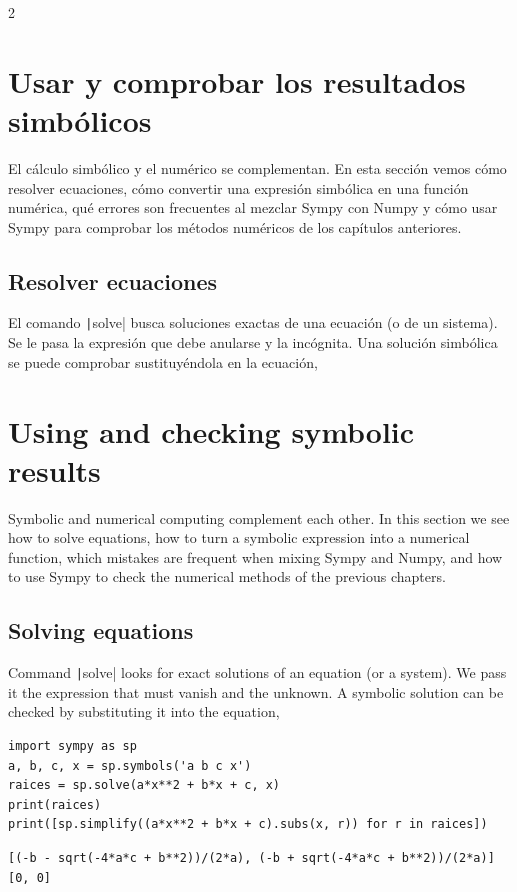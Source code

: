 \begin{paracol}{2}
\section{Usar y comprobar los resultados simbólicos}\label{sec:simb_comprobar}
El cálculo simbólico y el numérico se complementan. En esta sección vemos cómo resolver ecuaciones, cómo convertir una expresión simbólica en una función numérica, qué errores son frecuentes al mezclar Sympy con Numpy y cómo usar Sympy para comprobar los métodos numéricos de los capítulos anteriores.

\subsection{Resolver ecuaciones}
El comando \texttt|solve| busca soluciones exactas de una ecuación (o de un sistema). Se le pasa la expresión que debe anularse y la incógnita. Una solución simbólica se puede comprobar sustituyéndola en la ecuación,
\switchcolumn
\section{Using and checking symbolic results}\label{sec:simb_comprobar-2}
Symbolic and numerical computing complement each other. In this section we see how to solve equations, how to turn a symbolic expression into a numerical function, which mistakes are frequent when mixing Sympy and Numpy, and how to use Sympy to check the numerical methods of the previous chapters.

\subsection{Solving equations}
Command \texttt|solve| looks for exact solutions of an equation (or a system). We pass it the expression that must vanish and the unknown. A symbolic solution can be checked by substituting it into the equation,
\end{paracol}
\begin{verbatim}
import sympy as sp
a, b, c, x = sp.symbols('a b c x')
raices = sp.solve(a*x**2 + b*x + c, x)
print(raices)
print([sp.simplify((a*x**2 + b*x + c).subs(x, r)) for r in raices])
\end{verbatim}
\begin{verbatim}
[(-b - sqrt(-4*a*c + b**2))/(2*a), (-b + sqrt(-4*a*c + b**2))/(2*a)]
[0, 0]
\end{verbatim}
